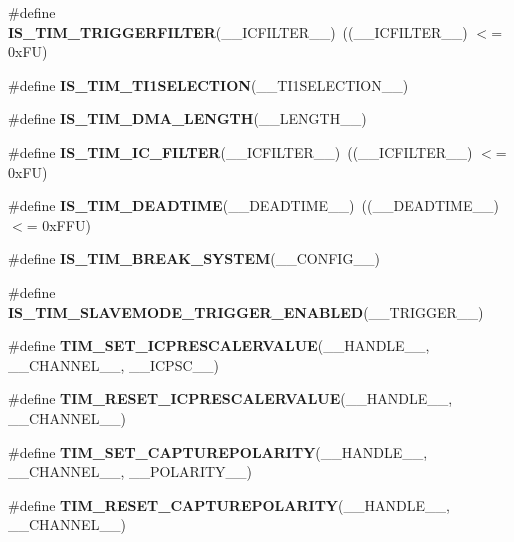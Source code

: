 \begin{DoxyCompactItemize}
\item 
\mbox{\label{group___t_i_m___private___macros_gab1d40d533bb6edb9920f682ab8b4f96a}} 
\#define {\bfseries I\+S\+\_\+\+T\+I\+M\+\_\+\+T\+R\+I\+G\+G\+E\+R\+F\+I\+L\+T\+ER}(\+\_\+\+\_\+\+I\+C\+F\+I\+L\+T\+E\+R\+\_\+\+\_\+)~((\+\_\+\+\_\+\+I\+C\+F\+I\+L\+T\+E\+R\+\_\+\+\_\+) $<$= 0x\+F\+U)
\item 
\#define {\bfseries I\+S\+\_\+\+T\+I\+M\+\_\+\+T\+I1\+S\+E\+L\+E\+C\+T\+I\+ON}(\+\_\+\+\_\+\+T\+I1\+S\+E\+L\+E\+C\+T\+I\+O\+N\+\_\+\+\_\+)
\item 
\#define {\bfseries I\+S\+\_\+\+T\+I\+M\+\_\+\+D\+M\+A\+\_\+\+L\+E\+N\+G\+TH}(\+\_\+\+\_\+\+L\+E\+N\+G\+T\+H\+\_\+\+\_\+)
\item 
\mbox{\label{group___t_i_m___private___macros_ga3844dc9afbc0894bf6ba16f1d3cb656c}} 
\#define {\bfseries I\+S\+\_\+\+T\+I\+M\+\_\+\+I\+C\+\_\+\+F\+I\+L\+T\+ER}(\+\_\+\+\_\+\+I\+C\+F\+I\+L\+T\+E\+R\+\_\+\+\_\+)~((\+\_\+\+\_\+\+I\+C\+F\+I\+L\+T\+E\+R\+\_\+\+\_\+) $<$= 0x\+F\+U)
\item 
\mbox{\label{group___t_i_m___private___macros_ga223fe03967fab834c92f4159fa2e2817}} 
\#define {\bfseries I\+S\+\_\+\+T\+I\+M\+\_\+\+D\+E\+A\+D\+T\+I\+ME}(\+\_\+\+\_\+\+D\+E\+A\+D\+T\+I\+M\+E\+\_\+\+\_\+)~((\+\_\+\+\_\+\+D\+E\+A\+D\+T\+I\+M\+E\+\_\+\+\_\+) $<$= 0x\+F\+F\+U)
\item 
\#define {\bfseries I\+S\+\_\+\+T\+I\+M\+\_\+\+B\+R\+E\+A\+K\+\_\+\+S\+Y\+S\+T\+EM}(\+\_\+\+\_\+\+C\+O\+N\+F\+I\+G\+\_\+\+\_\+)
\item 
\#define {\bfseries I\+S\+\_\+\+T\+I\+M\+\_\+\+S\+L\+A\+V\+E\+M\+O\+D\+E\+\_\+\+T\+R\+I\+G\+G\+E\+R\+\_\+\+E\+N\+A\+B\+L\+ED}(\+\_\+\+\_\+\+T\+R\+I\+G\+G\+E\+R\+\_\+\+\_\+)
\item 
\#define {\bfseries T\+I\+M\+\_\+\+S\+E\+T\+\_\+\+I\+C\+P\+R\+E\+S\+C\+A\+L\+E\+R\+V\+A\+L\+UE}(\+\_\+\+\_\+\+H\+A\+N\+D\+L\+E\+\_\+\+\_\+,  \+\_\+\+\_\+\+C\+H\+A\+N\+N\+E\+L\+\_\+\+\_\+,  \+\_\+\+\_\+\+I\+C\+P\+S\+C\+\_\+\+\_\+)
\item 
\#define {\bfseries T\+I\+M\+\_\+\+R\+E\+S\+E\+T\+\_\+\+I\+C\+P\+R\+E\+S\+C\+A\+L\+E\+R\+V\+A\+L\+UE}(\+\_\+\+\_\+\+H\+A\+N\+D\+L\+E\+\_\+\+\_\+,  \+\_\+\+\_\+\+C\+H\+A\+N\+N\+E\+L\+\_\+\+\_\+)
\item 
\#define {\bfseries T\+I\+M\+\_\+\+S\+E\+T\+\_\+\+C\+A\+P\+T\+U\+R\+E\+P\+O\+L\+A\+R\+I\+TY}(\+\_\+\+\_\+\+H\+A\+N\+D\+L\+E\+\_\+\+\_\+,  \+\_\+\+\_\+\+C\+H\+A\+N\+N\+E\+L\+\_\+\+\_\+,  \+\_\+\+\_\+\+P\+O\+L\+A\+R\+I\+T\+Y\+\_\+\+\_\+)
\item 
\#define {\bfseries T\+I\+M\+\_\+\+R\+E\+S\+E\+T\+\_\+\+C\+A\+P\+T\+U\+R\+E\+P\+O\+L\+A\+R\+I\+TY}(\+\_\+\+\_\+\+H\+A\+N\+D\+L\+E\+\_\+\+\_\+,  \+\_\+\+\_\+\+C\+H\+A\+N\+N\+E\+L\+\_\+\+\_\+)
\end{DoxyCompactItemize}



